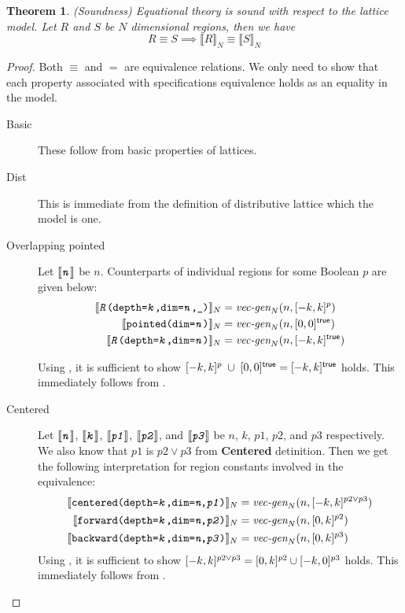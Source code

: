 \documentclass{article}
\theoremstyle{definition}
\theoremstyle{plain}
\newtheorem{thm}{Theorem}
\newcommand{\interp}[1]{\llbracket#1\rrbracket}
\newcommand{\interv}[3]{\textnormal{$\lbrack#1,#2\rbrack^{#3}$}}
\newcommand{\vecgen}[3]{\textnormal{$\textit{vec-gen}_{#1}(#2,#3)$}}
\newcommand{\textcap}[1]{\texttt{\textit{#1}}}
\begin{document}
\begin{thm}{(Soundness)}
  Equational theory is sound with respect to the lattice model. Let $R$
  and $S$ be $N$ dimensional regions, then we have
%
  \begin{equation*}
    R \equiv S \implies \interp{R}_N \equiv \interp{S}_N
  \end{equation*}
\end{thm}

\begin{proof}
  Both $\equiv$ and $=$ are equivalence relations. We only need to show that
  each property associated with specifications equivalence holds as an equality
  in the model.
%
  \begin{description}
    \item[Basic] These follow from basic properties of lattices.
%
    \item[Dist] This is immediate from the definition of distributive
      lattice which the model is one.
%
    \item[Overlapping pointed] Let $\interp{\textcap{n}}$ be $n$. Counterparts
      of individual regions for some Boolean $p$ are given below:
%
      \begin{align*}
        \interp{\texttt{\textcap{R}(depth=\textcap{k},dim=\textcap{n},\_)}}_N
        & = \vecgen{N}{n}{\interv{-k}{k}{p}} \\
%
        \interp{\texttt{pointed(dim=\textcap{n})}}_N
        &= \vecgen{N}{n}{\interv{0}{0}{\textsf{true}}} \\
%
        \interp{\texttt{\textcap{R}(depth=\textcap{k},dim=\textcap{n})}}_N
        &= \vecgen{N}{n}{\interv{-k}{k}{\textsf{true}}}
      \end{align*}

      Using , it is sufficient to show
      $ \interv{-k}{k}{p} \;\cup\; \interv{0}{0}{\textsf{true}} =
        \interv{-k}{k}{\textsf{true}} $ holds. This immediately follows from
      .
%
    \item[Centered] Let $\interp{\textcap{n}}$, $\interp{\textcap{k}}$,
      $\interp{\textcap{p1}}$, $\interp{\textcap{p2}}$, and
      $\interp{\textcap{p3}}$ be $n$, $k$, $p1$, $p2$, and $p3$ respectively. We
      also know that $p1$ is $p2 \vee p3$ from \textbf{Centered} detinition.
      Then we get the following interpretation for region constants involved in
      the equivalence:
%
      \begin{align*}
        \interp{\texttt{centered(depth=\textcap{k},dim=\textit{n},\textcap{p1})}}_N
          &= \vecgen{N}{n}{\interv{-k}{k}{p2 \vee p3}} \\
%
        \interp{\texttt{forward(depth=\textcap{k},dim=\textit{n},\textcap{p2})}}_N
          &= \vecgen{N}{n}{\interv{0}{k}{p2} }\\
%
        \interp{\texttt{backward(depth=\textcap{k},dim=\textit{n},\textcap{p3})}}_N
          &= \vecgen{N}{n}{\interv{0}{k}{p3}}
      \end{align*}
%
      Using , it is sufficient to show $\interv{-k}{k}{p2
      \vee p3} = \interv{0}{k}{p2} \cup \interv{-k}{0}{p3}$ holds. This
      immediately follows from .


\end{description}
\end{proof}
\end{document}
